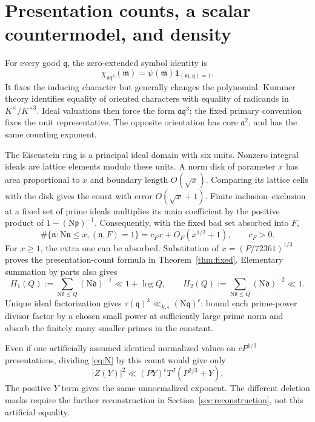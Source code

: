 \documentclass[11pt]{article}
\theoremstyle{remark}\newtheorem{remark}[theorem]{Remark}
\newcommand{\N}{\mathrm N}
\begin{document}
\section{Presentation counts, a scalar countermodel, and density}\label{sec:fibers}

For every good $\mathfrak q$, the zero-extended symbol identity is
\begin{equation}
\chi_{\mathfrak a\mathfrak q^3}(\mathfrak m)
=\psi(\mathfrak m)\mathbf1_{(\mathfrak m,\mathfrak q)=1}.
\label{eq:frozen11}
\end{equation}
It fixes the inducing character but generally changes the polynomial. Kummer theory identifies equality of oriented characters with equality of radicands in $K^\times/K^{\times3}$. Ideal valuations then force the form $\mathfrak a\mathfrak q^3$; the fixed primary convention fixes the unit representative. The opposite orientation has core $\mathfrak a^2$, and has the same counting exponent.

The Eisenstein ring is a principal ideal domain with six units. Nonzero integral ideals are lattice elements modulo these units. A norm disk of parameter $x$ has area proportional to $x$ and boundary length $O(\sqrt x)$. Comparing its lattice cells with the disk gives the count with error $O(\sqrt x+1)$. Finite inclusion--exclusion at a fixed set of prime ideals multiplies its main coefficient by the positive product of $1-(\N\mathfrak p)^{-1}$. Consequently, with the fixed bad set absorbed into $F$,
\begin{equation}
\#\{\mathfrak n:\N\mathfrak n\le x,(\mathfrak n,F)=1\}
=c_Fx+O_F(x^{1/2}+1),\qquad c_F>0.
\label{eq:frozen12}
\end{equation}
For $x\ge1$, the extra one can be absorbed. Substitution of $x=(P/72361)^{1/3}$ proves the presentation-count formula in Theorem~\ref{thm:fixed}. Elementary summation by parts also gives
\begin{equation}
H_1(Q):=\sum_{\N\mathfrak d\le Q}(\N\mathfrak d)^{-1}\ll1+\log Q,
\qquad
H_2(Q):=\sum_{\N\mathfrak d\le Q}(\N\mathfrak d)^{-2}\ll1.
\label{eq:frozen13}
\end{equation}
Unique ideal factorization gives $\tau(\mathfrak q)^k\ll_{k,\epsilon}(\N\mathfrak q)^\epsilon$: bound each prime-power divisor factor by a chosen small power at sufficiently large prime norm and absorb the finitely many smaller primes in the constant.

Even if one artificially assumed identical normalized values on $cP^{1/3}$ presentations, dividing \eqref{eq:N} by this count would give only
\[
|Z(Y)|^2\ll(PY)^\epsilon T^J(P^{2/3}+Y).
\]
The positive $Y$ term gives the same unnormalized exponent. The different deletion masks require the further reconstruction in Section~\ref{sec:reconstruction}, not this artificial equality.
\end{document}
